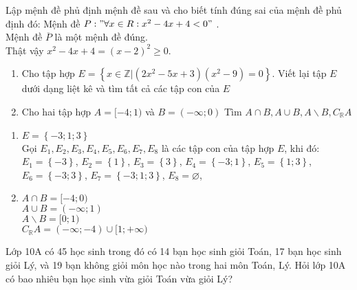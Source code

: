 \begin{bt}%
Lập mệnh đề phủ định mệnh đề sau và cho biết tính đúng sai của mệnh đề phủ định đó: Mệnh đề $P: " \forall x \in R: x ^2-4 x+4 < 0 "$
.\\
Mệnh đề $\overline{P}$ là một mệnh đề đúng.\\ Thật vậy
$x ^2-4 x+4=(x-2)^2 \geq 0$.
\end{bt}
\begin{bt}%
	\begin{enumerate}
		\item  Cho tập hợp $E=\left\{{x} \in \mathbb{Z} |\left(2 x ^2-5 x+3\right)\left(x^2-9\right)=0\right\}$. Viết lại tập $E$ dưới dạng liệt kê và tìm tất cả các tập con của $E$
		\item  Cho hai tập hợp $A=[-4; 1)$ và $B=(-\infty; 0)$ Tìm $A\cap B, A\cup B, A\backslash B, C_{\mathbb{R}} A$
	\end{enumerate}
	\loigiai
	{\begin{enumerate}
	\item $E=\left\{-3;1;3\right\}$\\ Gọi $E_1,E_2,E_3,E_4,E_5,E_6,E_7,E_8$ là các tập con của tập hợp $E$, khi đó:\\
	$E_1=\left\{-3\right\}$, $E_2=\left\{1\right\}$, $E_3=\left\{3\right\}$, $E_4=\left\{-3;1\right\}$, $E_5=\left\{1;3\right\}$, $E_6=\left\{-3;3\right\}$, $E_7=\left\{-3;1;3\right\}$, $E_8=\varnothing$, 
	\item $A\cap B=[-4;0)$\\
	$A\cup B=(-\infty;1)$\\
	$A\backslash B=[0;1)$\\
	$C_{\mathbb{R}} A=(-\infty;-4)\cup[1;+\infty)$
	\end{enumerate}}
\end{bt}
\begin{bt}%
Lớp 10A có 45 học sinh trong đó có 14 bạn học sinh giỏi Toán, 17 bạn học sinh giỏi Lý, và 19 bạn không giỏi môn học nào trong hai môn Toán, Lý. Hỏi lớp 10A có bao nhiêu bạn học sinh vừa giỏi Toán vừa giỏi Lý?
\end{bt}
